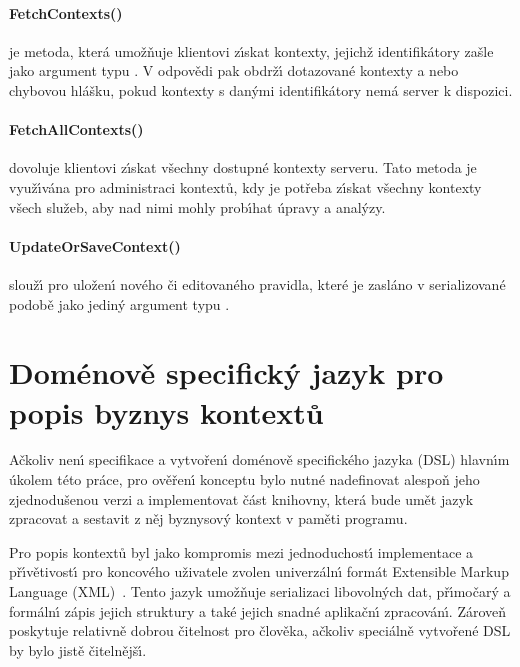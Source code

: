 \paragraph{FetchContexts()} je metoda, která umožňuje klientovi
z\'{\i}skat kontexty, jejichž identifikátory zašle jako argument
typu .
V odpovědi pak obdrž\'{\i} dotazované kontexty a nebo chybovou hlášku,
pokud kontexty s dan\'ymi identifikátory nemá server k dispozici.

\paragraph{FetchAllContexts()} dovoluje klientovi z\'{\i}skat všechny
dostupné kontexty serveru. Tato metoda je využ\'{\i}vána pro administraci
kontextů, kdy je potřeba z\'{\i}skat všechny kontexty všech služeb, aby
nad nimi mohly prob\'{\i}hat úpravy a anal\'yzy.

\paragraph{UpdateOrSaveContext()} slouž\'{\i} pro uložen\'{\i} nového či
editovaného pravidla, které je zasláno v serializované podobě
jako jedin\'y argument typu .

\section{Doménově specifick\'y jazyk pro popis byznys kontextů}\label{sec:dsl-impl}

Ačkoliv nen\'{\i} specifikace a vytvořen\'{\i} doménově specifického jazyka (\gls{DSL})
hlavn\'{\i}m úkolem této práce, pro ověřen\'{\i} konceptu bylo nutné nadefinovat
alespoň jeho zjednodušenou verzi a implementovat část knihovny, která
bude umět jazyk zpracovat a sestavit z něj byznysov\'y kontext v paměti programu.

Pro popis kontextů byl jako kompromis mezi jednoduchost\'{\i} implementace
a př\'{\i}větivost\'{\i} pro koncového uživatele zvolen univerzáln\'{\i} formát Extensible
Markup Language (\gls{XML})~\cite{bray1997extensible}. Tento
jazyk umožňuje serializaci libovoln\'ych dat, př\'{\i}močar\'y a formáln\'{\i}
zápis jejich struktury a také jejich snadné aplikačn\'{\i} zpracován\'{\i}.
Zároveň poskytuje relativně dobrou čitelnost pro člověka, ačkoliv
speciálně vytvořené \gls{DSL} by bylo jistě čitelnějš\'{\i}.

